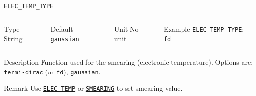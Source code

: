 \begin{frame}[allowframebreaks]{\texttt{ELEC\_TEMP\_TYPE}} \label{ELEC_TEMP_TYPE}
\vspace*{-12pt}
\begin{columns}
\begin{block}{Type}
String
\end{block}

\begin{block}{Default}
\texttt{gaussian}
\end{block}

\begin{block}{Unit}
No unit
\end{block}

\begin{block}{Example}
\texttt{ELEC\_TEMP\_TYPE}: \texttt{fd}
\end{block}
\end{columns}

\begin{block}{Description}
Function used for the smearing (electronic temperature). Options are: \texttt{fermi-dirac} (or \texttt{fd}), \texttt{gaussian}.
\end{block}

\begin{block}{Remark}
Use \hyperlink{ELEC_TEMP}{\texttt{ELEC\_TEMP}} or \hyperlink{SMEARING}{\texttt{SMEARING}} to set smearing value.
\end{block}

\end{frame}


